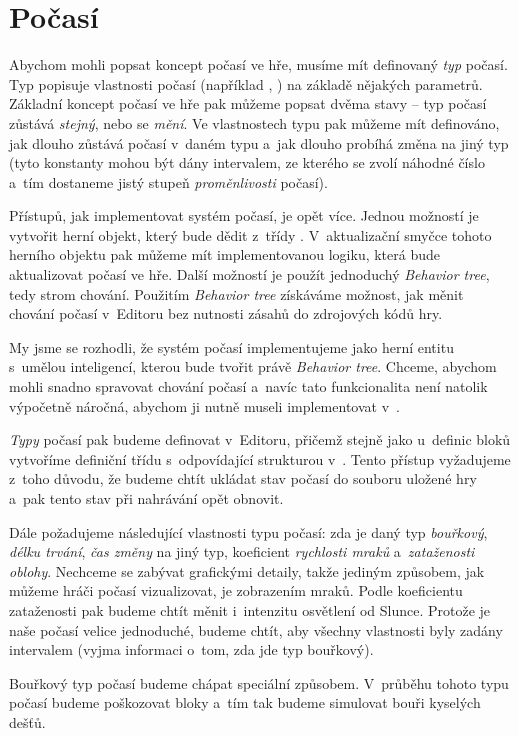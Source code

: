 
\section{Počasí}
\label{sec:poc}

Abychom mohli popsat koncept počasí ve hře, musíme mít definovaný \textit{typ} počasí. Typ popisuje vlastnosti počasí (například , ) na základě nějakých parametrů. Základní koncept počasí ve hře pak můžeme popsat dvěma stavy -- typ počasí zůstává \textit{stejný}, nebo se \textit{mění}. Ve vlastnostech typu pak můžeme mít definováno, jak dlouho zůstává počasí v~daném typu a~jak dlouho probíhá změna na jiný typ (tyto konstanty mohou být dány intervalem, ze kterého se zvolí náhodné číslo a~tím dostaneme jistý stupeň \textit{proměnlivosti} počasí).

Přístupů, jak implementovat systém počasí, je opět více. Jednou možností je vytvořit herní objekt, který bude dědit z~třídy . V~aktualizační smyčce tohoto herního objektu pak můžeme mít implementovanou logiku, která bude aktualizovat počasí ve hře. Další možností je použít jednoduchý \textit{Behavior tree}, tedy strom chování. Použitím \textit{Behavior tree} získáváme možnost, jak měnit chování počasí v~Editoru bez nutnosti zásahů do zdrojových kódů hry. 

My jsme se rozhodli, že systém počasí implementujeme jako herní entitu s~umělou inteligencí, kterou bude tvořit právě \textit{Behavior tree}. Chceme, abychom mohli snadno spravovat chování počasí a~navíc tato funkcionalita není natolik výpočetně náročná, abychom ji nutně museli implementovat v~\CPP{}.

\textit{Typy} počasí pak budeme definovat v~Editoru, přičemž stejně jako u~definic bloků vytvoříme definiční třídu s~odpovídající strukturou v~\CPP{}. Tento přístup vyžadujeme z~toho důvodu, že budeme chtít ukládat stav počasí do souboru uložené hry a~pak tento stav při nahrávání opět obnovit. 

Dále požadujeme následující vlastnosti typu počasí: zda je daný typ \textit{bouřkový}, \textit{délku trvání}, \textit{čas změny} na jiný typ, koeficient \textit{rychlosti mraků} a~\textit{zataženosti oblohy}. Nechceme se zabývat grafickými detaily, takže jediným způsobem, jak můžeme hráči počasí vizualizovat, je zobrazením mraků. Podle koeficientu zataženosti pak budeme chtít měnit i~intenzitu osvětlení od Slunce. Protože je naše počasí velice jednoduché, budeme chtít, aby všechny vlastnosti byly zadány intervalem (vyjma informaci o~tom, zda jde typ bouřkový).

Bouřkový typ počasí budeme chápat speciální způsobem. V~průběhu tohoto typu počasí budeme poškozovat bloky a~tím tak budeme simulovat bouři kyselých dešťů. 